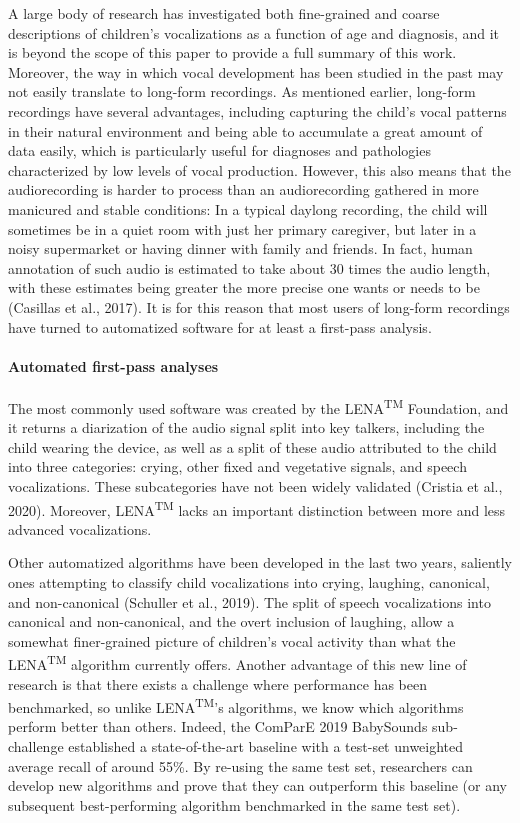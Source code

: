 \documentclass[english,,man]{apa6}
\begin{document}
A large body of research has investigated both fine-grained and coarse descriptions of children's vocalizations as a function of age and diagnosis, and it is beyond the scope of this paper to provide a full summary of this work. Moreover, the way in which vocal development has been studied in the past may not easily translate to long-form recordings. As mentioned earlier, long-form recordings have several advantages, including capturing the child's vocal patterns in their natural environment and being able to accumulate a great amount of data easily, which is particularly useful for diagnoses and pathologies characterized by low levels of vocal production. However, this also means that the audiorecording is harder to process than an audiorecording gathered in more manicured and stable conditions: In a typical daylong recording, the child will sometimes be in a quiet room with just her primary caregiver, but later in a noisy supermarket or having dinner with family and friends. In fact, human annotation of such audio is estimated to take about 30 times the audio length, with these estimates being greater the more precise one wants or needs to be (Casillas et al., 2017). It is for this reason that most users of long-form recordings have turned to automatized software for at least a first-pass analysis.

\hypertarget{automated-first-pass-analyses}{%
\paragraph{Automated first-pass analyses}\label{automated-first-pass-analyses}}

The most commonly used software was created by the LENA\textsuperscript{TM} Foundation, and it returns a diarization of the audio signal split into key talkers, including the child wearing the device, as well as a split of these audio attributed to the child into three categories: crying, other fixed and vegetative signals, and speech vocalizations. These subcategories have not been widely validated (Cristia et al., 2020). Moreover, LENA\textsuperscript{TM} lacks an important distinction between more and less advanced vocalizations.

Other automatized algorithms have been developed in the last two years, saliently ones attempting to classify child vocalizations into crying, laughing, canonical, and non-canonical (Schuller et al., 2019). The split of speech vocalizations into canonical and non-canonical, and the overt inclusion of laughing, allow a somewhat finer-grained picture of children's vocal activity than what the LENA\textsuperscript{TM} algorithm currently offers. Another advantage of this new line of research is that there exists a challenge where performance has been benchmarked, so unlike LENA\textsuperscript{TM}'s algorithms, we know which algorithms perform better than others. Indeed, the ComParE 2019 BabySounds sub-challenge established a state-of-the-art baseline with a test-set unweighted average recall of around 55\%. By re-using the same test set, researchers can develop new algorithms and prove that they can outperform this baseline (or any subsequent best-performing algorithm benchmarked in the same test set).
\end{document}
